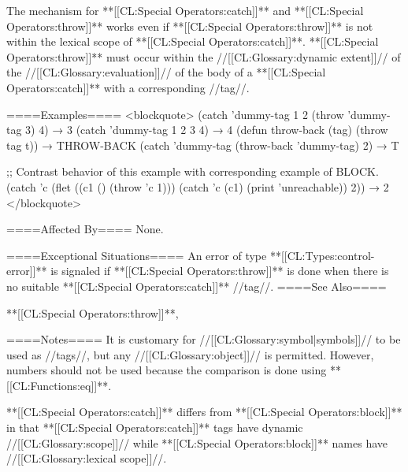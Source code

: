 The mechanism for **[[CL:Special Operators:catch]]** and **[[CL:Special Operators:throw]]** works even if **[[CL:Special Operators:throw]]** is not within the lexical scope of **[[CL:Special Operators:catch]]**. **[[CL:Special Operators:throw]]** must occur within the //[[CL:Glossary:dynamic extent]]// of the //[[CL:Glossary:evaluation]]// of the body of a **[[CL:Special Operators:catch]]** with a corresponding //tag//.

====Examples==== 
<blockquote> (catch 'dummy-tag 1 2 (throw 'dummy-tag 3) 4) → 3 (catch 'dummy-tag 1 2 3 4) → 4 (defun throw-back (tag) (throw tag t)) → THROW-BACK (catch 'dummy-tag (throw-back 'dummy-tag) 2) → T

;; Contrast behavior of this example with corresponding example of BLOCK. (catch 'c (flet ((c1 () (throw 'c 1))) (catch 'c (c1) (print 'unreachable)) 2)) → 2 </blockquote>

====Affected By====
None. 

====Exceptional Situations==== 
An error of type **[[CL:Types:control-error]]** is signaled if **[[CL:Special Operators:throw]]** is done when there is no suitable **[[CL:Special Operators:catch]]** //tag//. ====See Also====

**[[CL:Special Operators:throw]]**, {\secref\Evaluation}

====Notes====
It is customary for //[[CL:Glossary:symbol|symbols]]// to be used as //tags//, but any //[[CL:Glossary:object]]// is permitted. However, numbers should not be used because the comparison is done using **[[CL:Functions:eq]]**.

**[[CL:Special Operators:catch]]** differs from **[[CL:Special Operators:block]]** in that **[[CL:Special Operators:catch]]** tags have dynamic //[[CL:Glossary:scope]]// while **[[CL:Special Operators:block]]** names have //[[CL:Glossary:lexical scope]]//.
